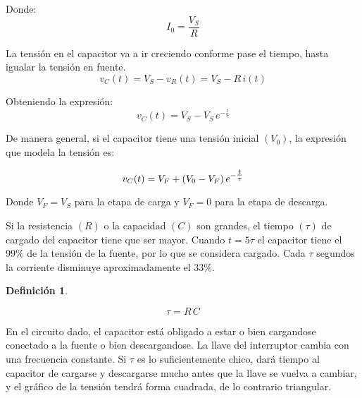 \documentclass[a5paper,12pt,twoside]{book}
\newtheorem{defn}{{Definición}}[chapter]
\begin{document}
Donde:
\begin{equation*}
    I_0 = \frac{V_S}{R}
\end{equation*}

\begin{center}
    \def\svgwidth{0.8\linewidth}
    
\end{center}

La tensión en el capacitor va a ir creciendo conforme pase el tiempo, hasta igualar la tensión en fuente.
\begin{equation*}
    v_C(t) = V_S - v_R(t) = V_S - R \, i(t)
\end{equation*}

Obteniendo la expresión:
\begin{equation*}
v_C(t) = V_S - V_S \, e^{-\tfrac{t}{\tau}}
\end{equation*}

\begin{center}
    \def\svgwidth{0.8\linewidth}
    
\end{center}

De manera general, si el capacitor tiene una tensión inicial $(V_0)$, la expresión que modela la tensión es:

\begin{equation*}
    v_C(t) = V_F + \left(V_0 - V_F\right) e^{-\tfrac{t}{\tau}}
\end{equation*}

Donde $V_F = V_S$ para la etapa de carga y $V_F = 0$ para la etapa de descarga.

Si la resistencia $(R)$ o la capacidad $(C)$ son grandes, el tiempo $(\tau)$ de cargado del capacitor tiene que ser mayor. Cuando $t=5\tau$ el capacitor tiene el $99\%$ de la tensión de la fuente, por lo que se considera cargado. Cada $\tau$ segundos la corriente disminuye aproximadamente el $33\%$.

\begin{mdframed}[style=MyFrame1]
    \begin{defn}
    \end{defn}
    \begin{equation*}
        \tau = R \, C
    \end{equation*}
\end{mdframed}

En el circuito dado, el capacitor está obligado a estar o bien cargandose conectado a la fuente o bien descargandose.
La llave del interruptor cambia con una frecuencia constante.
Si $\tau$ es lo suficientemente chico, dará tiempo al capacitor de cargarse y descargarse mucho antes que la llave se vuelva a cambiar, y el gráfico de la tensión tendrá forma cuadrada, de lo contrario triangular.
\end{document}
